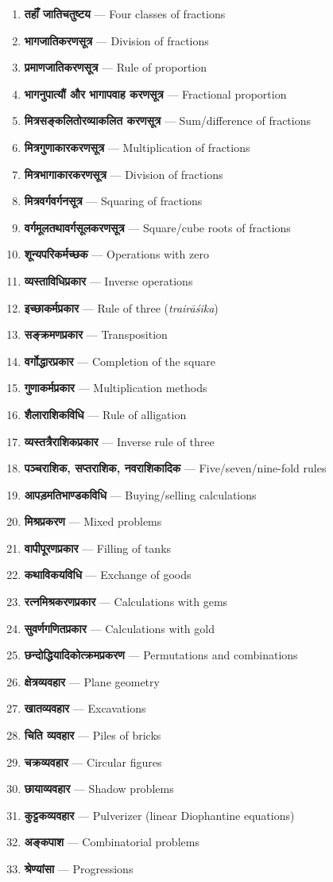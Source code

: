 \documentclass[11pt,a4paper]{book}
\begin{document}
\begin{enumerate}[label=\arabic*., leftmargin=*]
\item \textbf{तहाँं जातिचतुष्टय} — Four classes of fractions
\item \textbf{भागजातिकरणसूत्र} — Division of fractions
\item \textbf{प्रमाणजातिकरणसूत्र} — Rule of proportion
\item \textbf{भागनुपात्यौं और भागापवाह करणसूत्र} — Fractional proportion
\item \textbf{मित्रसङ्कलितोरव्याकलित करणसूत्र} — Sum/difference of fractions
\item \textbf{मित्रगुणाकारकरणसूत्र} — Multiplication of fractions
\item \textbf{मित्रभागाकारकरणसूत्र} — Division of fractions
\item \textbf{मित्रवर्गवर्गनसूत्र} — Squaring of fractions
\item \textbf{वर्गमूलतथावर्गसूलकरणसूत्र} — Square/cube roots of fractions
\item \textbf{शून्यपरिकर्मच्छक} — Operations with zero
\item \textbf{व्यस्ताविधिप्रकार} — Inverse operations
\item \textbf{इच्छाकर्मप्रकार} — Rule of three (\textit{trairāśika})
\item \textbf{सङ्क्रमणप्रकार} — Transposition
\item \textbf{वर्गोद्धारप्रकार} — Completion of the square
\item \textbf{गुणाकर्मप्रकार} — Multiplication methods
\item \textbf{शैलाराशिकविधि} — Rule of alligation
\item \textbf{व्यस्तत्रैराशिकप्रकार} — Inverse rule of three
\item \textbf{पञ्चराशिक, सप्तराशिक, नवराशिकादिक} — Five/seven/nine-fold rules
\item \textbf{आपड़मतिभाण्डकविधि} — Buying/selling calculations
\item \textbf{मिश्रप्रकरण} — Mixed problems
\item \textbf{वापीपूरणप्रकार} — Filling of tanks
\item \textbf{कथाविकयविधि} — Exchange of goods
\item \textbf{रत्नमिश्रकरणप्रकार} — Calculations with gems
\item \textbf{सुवर्णगणितप्रकार} — Calculations with gold
\item \textbf{छन्दोद्धियादिकोत्क्रमप्रकरण} — Permutations and combinations
\item \textbf{क्षेत्रव्यवहार} — Plane geometry
\item \textbf{खातव्यवहार} — Excavations
\item \textbf{चिति व्यवहार} — Piles of bricks
\item \textbf{चक्रव्यवहार} — Circular figures
\item \textbf{छायाव्यवहार} — Shadow problems
\item \textbf{कुट्टकव्यवहार} — Pulverizer (linear Diophantine equations)
\item \textbf{अङ्कपाश} — Combinatorial problems
\item \textbf{श्रेण्यांसा} — Progressions
\end{enumerate}
\end{document}
